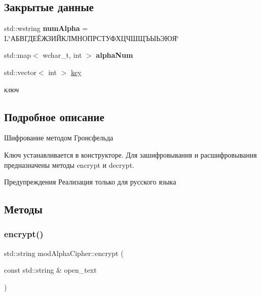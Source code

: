 \subsection*{Закрытые данные}
\begin{DoxyCompactItemize}
\item 
\mbox{\label{classmodAlphaCipher_ab7e0c7d3c87f4c8b7435d84f31c6cb62}} 
std\+::wstring {\bfseries num\+Alpha} = L\char`\"{}АБВГДЕЁЖЗИЙКЛМНОПРСТУФХЦЧШЩЪЫЬЭЮЯ\char`\"{}
\item 
\mbox{\label{classmodAlphaCipher_ad896cbfa7d4c32d1c9627b0812b4a677}} 
std\+::map$<$ wchar\+\_\+t, int $>$ {\bfseries alpha\+Num}
\item 
\mbox{\label{classmodAlphaCipher_aaddfb3bc0a3806b17e94c56fea5bad87}} 
std\+::vector$<$ int $>$ \hyperlink{classmodAlphaCipher_aaddfb3bc0a3806b17e94c56fea5bad87}{key}
\begin{DoxyCompactList}\small\item\em ключ \end{DoxyCompactList}\end{DoxyCompactItemize}


\subsection{Подробное описание}
Шифрование методом Гронсфельда 

Ключ устанавливается в конструкторе. Для зашифровывания и расшифровывания предназначены методы encrypt и decrypt. \begin{DoxyWarning}{Предупреждения}
Реализация только для русского языка 
\end{DoxyWarning}


\subsection{Методы}
\mbox{\label{classmodAlphaCipher_ab855d6b2ba63a70d84abc8b15700da63}} 
\subsubsection{\texorpdfstring{encrypt()}{encrypt()}}
{\footnotesize\ttfamily std\+::string mod\+Alpha\+Cipher\+::encrypt (\begin{DoxyParamCaption}\item[{const std\+::string \&}]{open\+\_\+text }\end{DoxyParamCaption})}



